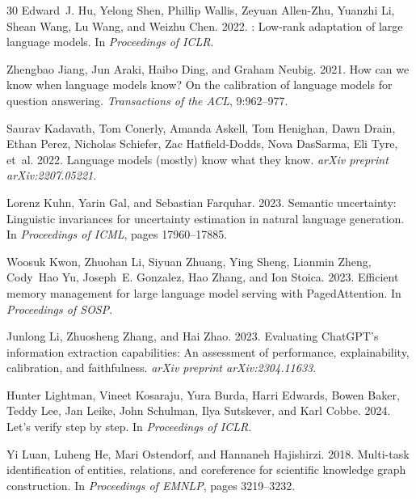 \documentclass[11pt,a4paper]{article}
\begin{document}
\begin{thebibliography}{30}
Edward~J. Hu, Yelong Shen, Phillip Wallis, Zeyuan Allen-Zhu, Yuanzhi Li, Shean Wang, Lu Wang, and Weizhu Chen. 2022.
: Low-rank adaptation of large language models.
\newblock In \emph{Proceedings of ICLR}.

Zhengbao Jiang, Jun Araki, Haibo Ding, and Graham Neubig. 2021.
\newblock How can we know when language models know? {O}n the calibration of language models for question answering.
\newblock \emph{Transactions of the ACL}, 9:962--977.

Saurav Kadavath, Tom Conerly, Amanda Askell, Tom Henighan, Dawn Drain, Ethan Perez, Nicholas Schiefer, Zac Hatfield-Dodds, Nova DasSarma, Eli Tyre, et~al. 2022.
\newblock Language models (mostly) know what they know.
\newblock \emph{arXiv preprint arXiv:2207.05221}.

Lorenz Kuhn, Yarin Gal, and Sebastian Farquhar. 2023.
\newblock Semantic uncertainty: Linguistic invariances for uncertainty estimation in natural language generation.
\newblock In \emph{Proceedings of ICML}, pages 17960--17885.

Woosuk Kwon, Zhuohan Li, Siyuan Zhuang, Ying Sheng, Lianmin Zheng, Cody~Hao Yu, Joseph~E. Gonzalez, Hao Zhang, and Ion Stoica. 2023.
\newblock Efficient memory management for large language model serving with {PagedAttention}.
\newblock In \emph{Proceedings of SOSP}.

Junlong Li, Zhuosheng Zhang, and Hai Zhao. 2023.
\newblock Evaluating {ChatGPT}'s information extraction capabilities: An assessment of performance, explainability, calibration, and faithfulness.
\newblock \emph{arXiv preprint arXiv:2304.11633}.

Hunter Lightman, Vineet Kosaraju, Yura Burda, Harri Edwards, Bowen Baker, Teddy Lee, Jan Leike, John Schulman, Ilya Sutskever, and Karl Cobbe. 2024.
\newblock Let's verify step by step.
\newblock In \emph{Proceedings of ICLR}.

Yi Luan, Luheng He, Mari Ostendorf, and Hannaneh Hajishirzi. 2018.
\newblock Multi-task identification of entities, relations, and coreference for scientific knowledge graph construction.
\newblock In \emph{Proceedings of EMNLP}, pages 3219--3232.


\end{thebibliography}
\end{document}

